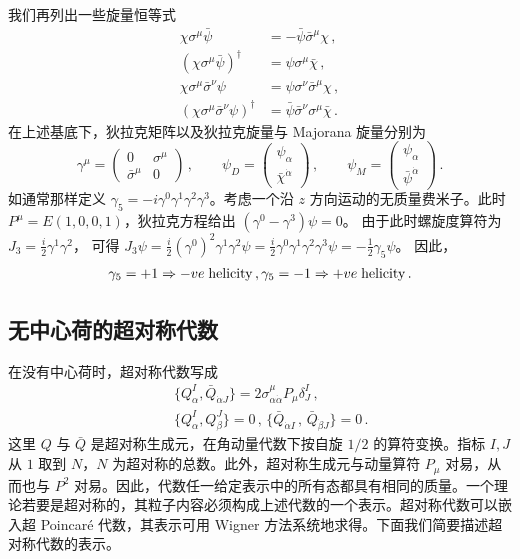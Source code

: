 我们再列出一些旋量恒等式
$$
\begin{array}{rl}
\chi\sigma^\mu\bar{\psi} & =-\bar{\psi}\bar{\sigma}^\mu\chi\,, \\
(\chi\sigma^\mu\bar{\psi})^\dagger & =\psi\sigma^\mu\bar{\chi}\,, \\
\chi\sigma^\mu\bar{\sigma}^\nu\psi & =\psi\sigma^\nu\bar{\sigma}^\mu
\chi \,,\\ 
(\chi\sigma^\mu\bar{\sigma}^\nu\psi)^\dagger & =\bar{\psi} 
\bar{\sigma}^\nu \sigma^\mu \bar{\chi}\,.
\end{array}
$$
在上述基底下，狄拉克矩阵以及狄拉克旋量与 Majorana 旋量分别为
\begin{equation}
\gamma^\mu = \left( \begin{array}{cc}
0 & \sigma^\mu \\ \bar{\sigma}^\mu & 0 \end{array} \right)\,, \qquad
\psi_D=\left(\begin{array}{c}\psi_\alpha\\\bar{\chi}^{\dot\alpha}
\end{array}\right)\,,\qquad
\psi_M=\left(\begin{array}{c}\psi_\alpha\\{\bar{\psi}^{\dot{\alpha}}}
\end{array}\right)\,.
\label{sp-comp}
\end{equation}
如通常那样定义 $\gamma_5=-i\gamma^0\gamma^1\gamma^2\gamma^3$。考虑一个沿 $z$ 方向运动的无质量费米子。此时 $P^\mu=
E(1,0,0,1)$，狄拉克方程给出 $(\gamma^0-\gamma^3)\psi=0$。
由于此时螺旋度算符为 $J_3=\frac{i}{2}\gamma^1\gamma^2$，
可得 $J_3\psi=\frac{i}{2}(\gamma^0)^2 \gamma^1\gamma^2\psi =
\frac{i}{2}\gamma^0\gamma^1\gamma^2\gamma^3\psi=-\frac{1}{2}\gamma_5\psi$。
因此，
$$
\gamma_5 =+1 \Rightarrow -ve \;{\rm helicity}\,,
\gamma_5 =-1 \Rightarrow +ve \;{\rm helicity}\,.
$$


\subsection{无中心荷的超对称代数}

在没有中心荷时，超对称代数写成
\begin{eqnarray}
&&\{ Q^{I}_{\alpha}, \bar{Q}_{\dot{\alpha} J} \} = 2
\sigma^\mu_{\alpha \dot{\alpha}} P_\mu \delta^{I}_{J}\,, 
\nonumber\\
&&\{Q^I_\alpha , Q^J_\beta\}=0\,,\,\{{\bar Q}_{\dot\alpha I}\,,\, 
{\bar Q}_{\dot\beta J}\}=0\,.
\label{susy-noC}
\end{eqnarray}
这里 $Q$ 与 $\bar Q$ 是超对称生成元，在角动量代数下按自旋 $1/2$ 的算符变换。指标 $I, J$ 从 $1$ 取到 $N$，$N$ 为超对称的总数。此外，超对称生成元与动量算符 $P_\mu$ 对易，从而也与 $P^2$ 对易。因此，代数任一给定表示中的所有态都具有相同的质量。一个理论若要是超对称的，其粒子内容必须构成上述代数的一个表示。超对称代数可以嵌入超 Poincaré 代数，其表示可用 Wigner 方法系统地求得。下面我们简要描述超对称代数的表示。

